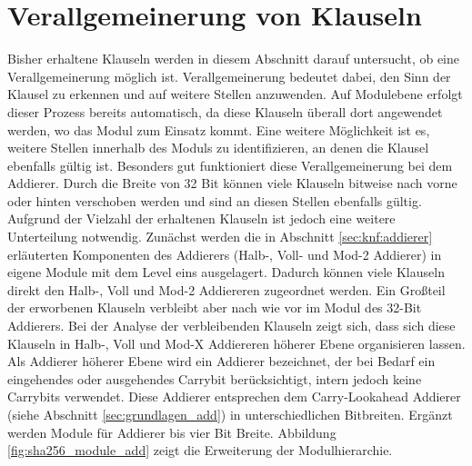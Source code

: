 \section{Verallgemeinerung von Klauseln}
\label{sec:ana:generalize}

Bisher erhaltene Klauseln werden in diesem Abschnitt darauf untersucht, ob eine Verallgemeinerung möglich ist. Verallgemeinerung bedeutet dabei, den Sinn der Klausel
zu erkennen und auf weitere Stellen anzuwenden. Auf Modulebene erfolgt dieser Prozess bereits automatisch, da diese Klauseln überall dort angewendet werden, wo das
Modul zum Einsatz kommt. Eine weitere Möglichkeit ist es, weitere Stellen innerhalb des Moduls zu identifizieren, an denen die Klausel ebenfalls gültig ist. Besonders
gut funktioniert diese Verallgemeinerung bei dem Addierer. Durch die Breite von 32 Bit können viele Klauseln bitweise nach vorne oder hinten verschoben werden und sind
an diesen Stellen ebenfalls gültig. Aufgrund der Vielzahl der erhaltenen Klauseln ist jedoch eine weitere Unterteilung notwendig. Zunächst werden die in Abschnitt
\ref{sec:knf:addierer} erläuterten Komponenten des Addierers (Halb-, Voll- und Mod-2 Addierer) in eigene Module mit dem Level eins ausgelagert. Dadurch können viele
Klauseln direkt den Halb-, Voll und Mod-2 Addiereren zugeordnet werden. Ein Großteil der erworbenen Klauseln verbleibt aber nach wie vor im Modul des 32-Bit Addierers.
Bei der Analyse der verbleibenden Klauseln zeigt sich, dass sich diese Klauseln in Halb-, Voll und Mod-X Addiereren höherer Ebene organisieren lassen. Als Addierer
höherer Ebene wird ein Addierer bezeichnet, der bei Bedarf ein eingehendes oder ausgehendes Carrybit berücksichtigt, intern jedoch keine Carrybits verwendet. Diese
Addierer entsprechen dem Carry-Lookahead Addierer (siehe Abschnitt \ref{sec:grundlagen_add}) in unterschiedlichen Bitbreiten. Ergänzt werden Module für Addierer bis
vier Bit Breite. Abbildung \ref{fig:sha256_module_add} zeigt die Erweiterung der Modulhierarchie.
